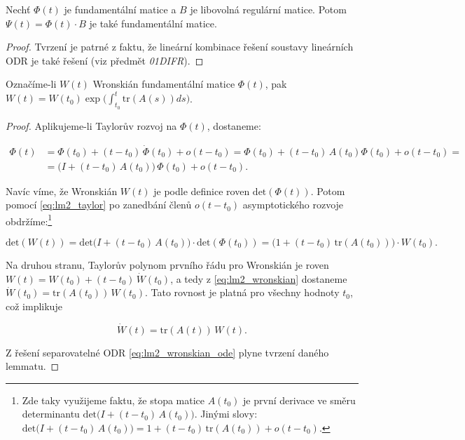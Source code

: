 \medskip

\begin{lemma}\label{lm:1}
	Nechť $\Phi(t)$ je fundamentální matice a $B$ je libovolná regulární matice. Potom $\Psi(t) = \Phi(t) \cdot B$ je také fundamentální matice.
	
	\begin{proof}
		Tvrzení je patrné z faktu, že lineární kombinace řešení soustavy lineárních ODR je také řešení (viz předmět \textit{01DIFR}).
	\end{proof}
\end{lemma}

\begin{lemma}\label{lm:2}
	Označíme-li $W(t)$ Wronskián fundamentální matice $\Phi(t)$, pak $W(t) = W(t_{0}) \exp \big( {\int_{t_{0}}^{t}} \mathrm{tr}(A(s)) ds \big)$.
	
	\begin{proof}
		Aplikujeme-li Taylorův rozvoj na $\Phi(t)$, dostaneme: 
		
		\begin{equation}\label{eq:lm2_taylor}
			\begin{split}
				\Phi(t) &= \Phi(t_{0}) + (t - t_{0}) \, \dot{\Phi}(t_{0}) + o(t-t_{0}) 
				= 
				\Phi(t_{0}) + (t - t_{0}) \, A(t_{0}) \Phi(t_{0}) + o(t-t_{0}) = \\
				&= \Big( I + (t - t_{0}) \, A(t_{0}) \Big) \, \Phi(t_{0}) + o(t-t_{0}). 
			\end{split}
		\end{equation}
		
		Navíc víme, že Wronskián $W(t)$ je podle definice roven $\mathrm{det}(\Phi(t))$. Potom pomocí \eqref{eq:lm2_taylor} po zanedbání členů $o(t-t_{0})$ asymptotického rozvoje obdržíme:\footnote{Zde taky využijeme faktu, že stopa matice $A(t_{0})$ je první derivace ve směru determinantu $\mathrm{det} \Big( I + (t - t_{0}) \, A(t_{0}) \Big)$. Jinými slovy: $\mathrm{det} \Big( I + (t - t_{0}) \, A(t_{0}) \Big) = 1 + (t - t_{0}) \, \mathrm{tr} (A(t_{0})) + o(t-t_{0})$.}
		
		\begin{equation}\label{eq:lm2_wronskian}
			\mathrm{det}(W(t))	= \mathrm{det} \Big( I + (t - t_{0}) \, A(t_{0}) \Big) \cdot \mathrm{det}(\Phi(t_{0})) 
			=
			\Big( 1 + (t - t_{0}) \, \mathrm{tr} (A(t_{0})) \Big) \cdot W(t_{0}) .
		\end{equation}
		
		Na druhou stranu, Taylorův polynom prvního řádu pro Wronskián je roven $W(t) = W(t_{0}) + (t-t_{0}) \, \dot{W}(t_{0})$, a tedy z \eqref{eq:lm2_wronskian} dostaneme $\dot{W}(t_{0} ) =  \mathrm{tr} (A(t_{0})) \, W(t_{0})$. Tato rovnost je platná pro všechny hodnoty $t_{0}$, což implikuje
		
		\begin{equation}\label{eq:lm2_wronskian_ode}
			\dot{W}(t) = \mathrm{tr} (A(t)) \, W(t).
		\end{equation}
		
		Z řešení separovatelné ODR \eqref{eq:lm2_wronskian_ode} plyne tvrzení daného lemmatu.
	\end{proof}
\end{lemma}


